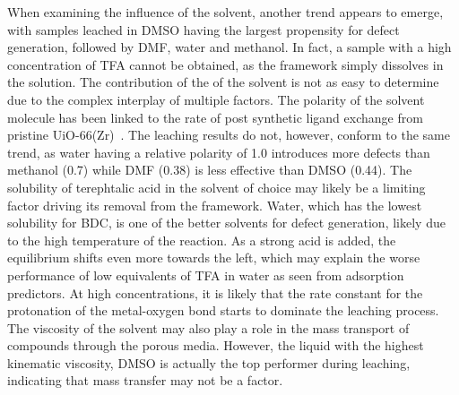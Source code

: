 When examining the influence of the solvent, another trend appears
to emerge, with samples leached in \gls{DMSO} having the largest propensity
for defect generation, followed by \gls{DMF}, water and methanol. In fact,
a sample with a high concentration of \gls{TFA} cannot be obtained, as the 
framework simply dissolves in the solution.
The contribution of the of the solvent is not as easy to determine due
to the complex interplay of multiple factors.
The polarity of the solvent molecule has been linked to 
the rate of post synthetic ligand exchange from
pristine UiO-66(Zr)~\cite{kimPostsyntheticLigandExchange2012}. The leaching
results do not, however, conform to the same trend, as water having a 
relative polarity of 1.0 introduces more defects than methanol 
(0.7) while \gls{DMF} (0.38) is less effective than 
\gls{DMSO} (0.44). The solubility of terephtalic acid in the solvent 
of choice may likely be a limiting factor driving its removal
from the framework. Water, which has the lowest solubility for 
\gls{BDC}, is one of the better solvents for defect generation, likely
due to the high temperature of the reaction. As a strong acid
is added, the equilibrium shifts even more towards the 
left, which may explain the worse performance of low equivalents of \gls{TFA}
in water as seen from adsorption predictors. At high concentrations,
it is likely that the rate constant for the protonation of the 
metal-oxygen bond starts to dominate the leaching process.
The viscosity of the 
solvent may also play a role in the mass transport of compounds 
through the porous media. However, the liquid with the highest 
kinematic viscosity, \gls{DMSO} is actually the top performer during leaching,
indicating that mass transfer may not be a factor.

